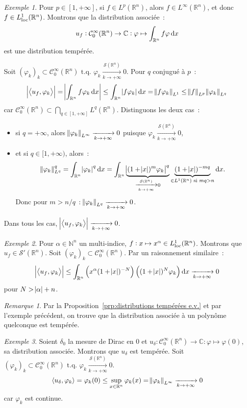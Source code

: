 \documentclass{report}
\newcommand{\C}{{\mathbb C}}
\newcommand{\R}{{\mathbb R}}
\newcommand{\N}{{\mathbb N}}
\newcommand{\scpr}[2]{\left\langle#1, #2\right\rangle}
\newcommand{\tq}{\text{ t.q. }}
\newcommand{\st}{\tq}
\newcommand{\pinfty}{{+\infty}}
\newcommand{\loc}{{\text{\textnormal{loc}}}}
\theoremstyle{definition}
\theoremstyle{remark}
\newtheorem*{rmq}{Remarque}
\newtheorem{ex}{Exemple}[chapter]
\begin{document}
\begin{ex} Pour $p \in [1, \pinfty]$, si $f \in L^p(\R^n)$, alors $f \in L^\infty(\R^n)$, et donc $f \in L^1_\loc(\R^n)$. Montrons que la distribution associée~:
\[u_f : \mathcal C^\infty_0(\R^n) \to \C : \varphi \mapsto \int_{\R^n}f\varphi\dif x\]
est une distribution tempérée.

Soit $(\varphi_k)_k \subset \mathcal C^\infty_0(\R^n) \st \varphi_k \xrightarrow[k \to \pinfty]{\mathcal S(\R^n)} 0$. Pour $q$ conjugué à $p$~:
\[\abs {\scpr {u_f}{\varphi_k}} = \abs {\int_{\R^n}f\varphi_k\dif x} \leq \int_{\R^n}\abs {f\varphi_k}\dif x = \norm {f\varphi_k}_{L^1} \leq \norm f_{L^p}\norm {\varphi_k}_{L^q}\]
car $\mathcal C^\infty_0(\R^n) \subset \bigcap_{q \in [1, \pinfty]}L^q(\R^n)$. Distinguons les deux cas~:
\begin{itemize}
	\item si $q = \pinfty$, alors $\norm {\varphi_k}_{L^\infty} \xrightarrow[k \to \pinfty]{} 0$ puisque $\varphi_k \xrightarrow[k \to \pinfty]{\mathcal S(\R^n)} 0$,
	\item et si $q \in [1, \pinfty)$, alors~:
	\[\norm {\varphi_k}_{L^q}^q = \int_{\R^n}\abs {\varphi_k}^q\dif x
	= \int_{\R^n}\underbrace {\abs {(1+\abs x)^m\varphi_k}^q}_{\xrightarrow[k \to \pinfty]{\mathcal S(\R^n)} 0}\underbrace {(1+\abs x)^{-mq}}_{\in L^1(\R^n) \text{ si } mq > n}\dif x.\]
	Donc pour $m > n/q$~: $\norm {\varphi_k}_{L^q} \xrightarrow[k \to \pinfty]{} 0$.
\end{itemize}

Dans tous les cas, $\abs {\scpr {u_f}{\varphi_k}} \xrightarrow[k \to \pinfty]{} 0$.
\end{ex}

\begin{ex} Pour $\alpha \in \N^n$ un multi-indice, $f : x \mapsto x^\alpha \in L^1_\loc(\R^n)$. Montrons que $u_f \in \mathcal S'(\R^n)$. Soit $(\varphi_k)_k \subset \mathcal C^\infty_0(\R^n)$.
Par un raisonnement similaire~:
\[\abs {\scpr {u_f}{\varphi_k}} \leq \int_{\R^n} \left(x^\alpha(1+\abs x)^{-N}\right)\left((1+\abs x)^N\varphi_k\right)\dif x \xrightarrow[k \to \pinfty]{} 0\]
pour $N > \abs \alpha + n$.
\end{ex}

\begin{rmq} Par la Proposition~\ref{prp:distributions tempérées e.v.} et par l'exemple précédent, on trouve que la distribution associée à un polynôme quelconque est tempérée.
\end{rmq}

\begin{ex} Soient $\delta_0$ la mesure de Dirac en $0$ et $u_\delta : \mathcal C^\infty_0(\R^n) \to \C : \varphi \mapsto \varphi(0)$, sa distribution associée. Montrons que $u_\delta$
est tempérée. Soit $(\varphi_k)_k \subset \mathcal C^\infty_0(\R^n) \st \varphi_k \xrightarrow[k \to \pinfty]{\mathcal S(\R^n)} 0$.
\[\scpr {u_\delta}{\varphi_k} = \varphi_k(0) \leq \sup_{x \in \R^n}\varphi_k(x) = \norm {\varphi_k}_{L^\infty} \xrightarrow[k \to \pinfty]{} 0\]
car $\varphi_k$ est continue.
\end{ex}
\end{document}
